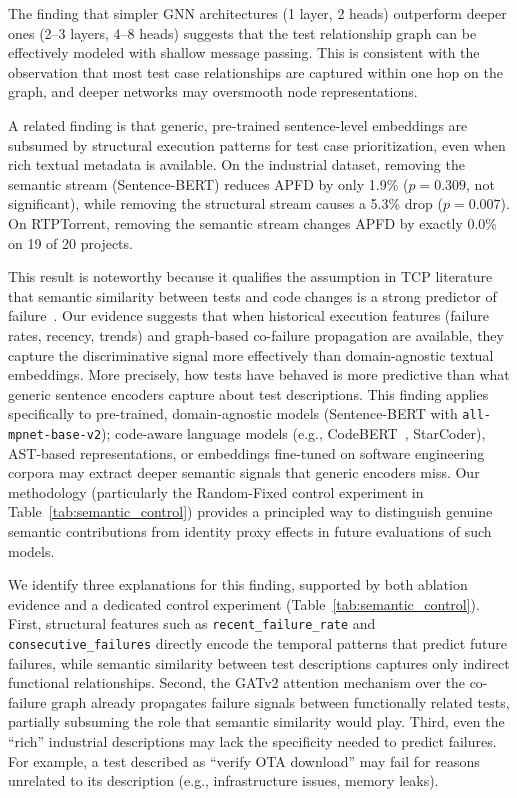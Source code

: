 The finding that simpler GNN architectures (1 layer, 2 heads) outperform deeper
ones (2--3 layers, 4--8 heads) suggests that the test relationship graph can be
effectively modeled with shallow message passing. This is consistent with the
observation that most test case relationships are captured within one hop on
the graph, and deeper networks may oversmooth node representations.

A related finding is that generic, pre-trained sentence-level
embeddings are subsumed by structural execution patterns for test case
prioritization, even when rich textual metadata is available. On the
industrial dataset, removing the semantic stream (Sentence-BERT) reduces
APFD by only 1.9\% ($p = 0.309$, not significant), while removing the
structural stream causes a 5.3\% drop ($p = 0.007$). On RTPTorrent,
removing the semantic stream changes APFD by exactly 0.0\% on 19 of 20
projects.

This result is noteworthy because it qualifies the assumption in TCP
literature that semantic similarity between tests and code changes is a
strong predictor of failure~\cite{hernandes2025method}. Our evidence
suggests that when historical execution features (failure rates, recency,
trends) and graph-based co-failure propagation are available, they capture
the discriminative signal more effectively than domain-agnostic textual
embeddings. More precisely, how tests have behaved is more
predictive than what generic sentence encoders capture about test
descriptions. This finding applies specifically to pre-trained,
domain-agnostic models (Sentence-BERT with \texttt{all-mpnet-base-v2});
code-aware language models (e.g., CodeBERT~\cite{feng2020codebert},
StarCoder), AST-based representations, or embeddings fine-tuned on
software engineering corpora may extract deeper semantic signals that
generic encoders miss. Our methodology (particularly the Random-Fixed
control experiment in Table~\ref{tab:semantic_control}) provides a
principled way to distinguish genuine semantic contributions from identity
proxy effects in future evaluations of such models.

We identify three explanations for this finding, supported by both
ablation evidence and a dedicated control experiment
(Table~\ref{tab:semantic_control}). First, structural features such as
\texttt{recent\_failure\_rate} and \texttt{consecutive\_failures} directly
encode the temporal patterns that predict future failures, while semantic
similarity between test descriptions captures only indirect functional
relationships. Second, the GATv2 attention mechanism over the co-failure
graph already propagates failure signals between functionally related
tests, partially subsuming the role that semantic similarity would play.
Third, even the ``rich'' industrial descriptions may lack the specificity
needed to predict failures. For example, a test described as ``verify OTA
download'' may fail for reasons unrelated to its description (e.g.,
infrastructure issues, memory leaks).

